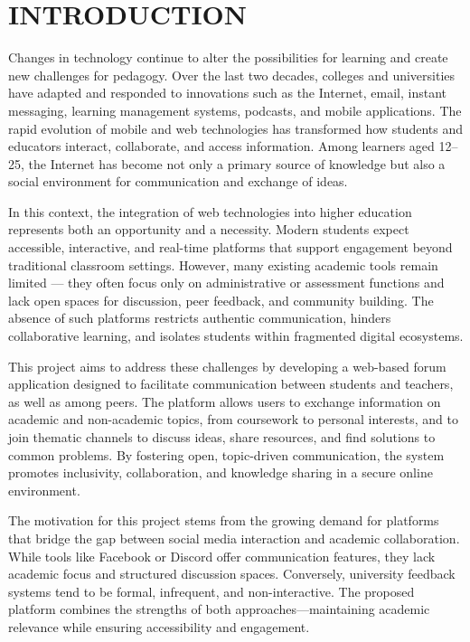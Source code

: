 \chapter*{INTRODUCTION}



Changes in technology continue to alter the possibilities for learning and create new challenges for pedagogy. Over the last two decades, colleges and universities have adapted and responded to innovations such as the Internet, email, instant messaging, learning management systems, podcasts, and mobile applications. The rapid evolution of mobile and web technologies has transformed how students and educators interact, collaborate, and access information. Among learners aged 12–25, the Internet has become not only a primary source of knowledge but also a social environment for communication and exchange of ideas.

In this context, the integration of web technologies into higher education represents both an opportunity and a necessity. Modern students expect accessible, interactive, and real-time platforms that support engagement beyond traditional classroom settings. However, many existing academic tools remain limited — they often focus only on administrative or assessment functions and lack open spaces for discussion, peer feedback, and community building. The absence of such platforms restricts authentic communication, hinders collaborative learning, and isolates students within fragmented digital ecosystems.

This project aims to address these challenges by developing a web-based forum application designed to facilitate communication between students and teachers, as well as among peers. The platform allows users to exchange information on academic and non-academic topics, from coursework to personal interests, and to join thematic channels to discuss ideas, share resources, and find solutions to common problems. By fostering open, topic-driven communication, the system promotes inclusivity, collaboration, and knowledge sharing in a secure online environment.

The motivation for this project stems from the growing demand for platforms that bridge the gap between social media interaction and academic collaboration. While tools like Facebook or Discord offer communication features, they lack academic focus and structured discussion spaces. Conversely, university feedback systems tend to be formal, infrequent, and non-interactive. The proposed platform combines the strengths of both approaches—maintaining academic relevance while ensuring accessibility and engagement.

